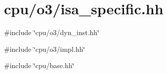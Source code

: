\hypertarget{isa__specific_8hh}{
\section{cpu/o3/isa\_\-specific.hh}
\label{isa__specific_8hh}
}
{\ttfamily \#include \char`\"{}cpu/o3/dyn\_\-inst.hh\char`\"{}}\par
{\ttfamily \#include \char`\"{}cpu/o3/impl.hh\char`\"{}}\par
{\ttfamily \#include \char`\"{}cpu/base.hh\char`\"{}}\par
